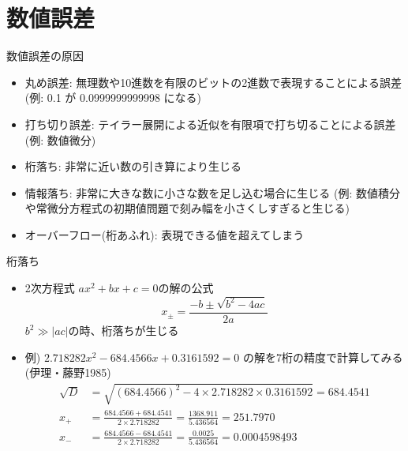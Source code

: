\section{数値誤差}

\begin{frame}[t,fragile]{数値誤差の原因}
  \begin{itemize}
    \setlength{\itemsep}{1em}
  \item 丸め誤差: 無理数や10進数を有限のビットの2進数で表現することによる誤差
    (例: 0.1 が 0.0999999999998 になる)
  \item 打ち切り誤差: テイラー展開による近似を有限項で打ち切ることによる誤差
    (例: 数値微分)
  \item 桁落ち: 非常に近い数の引き算により生じる
  \item 情報落ち: 非常に大きな数に小さな数を足し込む場合に生じる
    (例: 数値積分や常微分方程式の初期値問題で刻み幅を小さくしすぎると生じる)
  \item オーバーフロー(桁あふれ): 表現できる値を超えてしまう
  \end{itemize}
\end{frame}

\begin{frame}[t,fragile]{桁落ち}
  \begin{itemize}
    \setlength{\itemsep}{1em}
  \item 2次方程式 $ax^2+bx+c=0$の解の公式
    \[
    x_{\pm} = \frac{-b \pm \sqrt{b^2-4ac}}{2a}
    \]
    $b^2 \gg |ac|$の時、桁落ちが生じる
  \item 例) $2.718282x^2 - 684.4566x+0.3161592=0$ の解を7桁の精度で計算してみる(伊理・藤野1985)
    \begin{align*}
      \sqrt{D} &= \sqrt{(684.4566)^2 - 4 \times 2.718282 \times 0.3161592} = 684.4541 \\
      x_+ &= \frac{684.4566+684.4541}{2 \times 2.718282} = \frac{1368.911}{5.436564} = 251.7970 \\
      x_- &= \frac{684.4566-684.4541}{2 \times 2.718282} = \frac{0.0025}{5.436564} = 0.00045\underline{98493}
    \end{align*}
  \end{itemize}
\end{frame}

